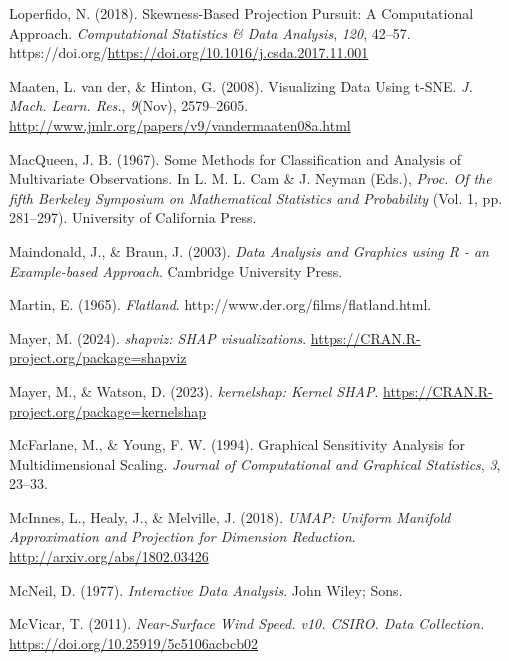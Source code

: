 \documentclass[
  letterpaper,
]{krantz}
\newlength{\cslhangindent}
\newenvironment{CSLReferences}[2] %
 {\begin{list}{}{%
  \setlength{\itemindent}{0pt}
  \setlength{\leftmargin}{0pt}
  \setlength{\parsep}{0pt}
  \ifodd #1
   \setlength{\leftmargin}{\cslhangindent}
   \setlength{\itemindent}{-1\cslhangindent}
  \fi
  \setlength{\itemsep}{#2\baselineskip}}}
 {\end{list}}
\begin{document}
\begin{CSLReferences}{1}{0}
Loperfido, N. (2018). Skewness-{B}ased {P}rojection {P}ursuit: A
{C}omputational {A}pproach. \emph{Computational Statistics \& Data
Analysis}, \emph{120}, 42--57.
https://doi.org/\url{https://doi.org/10.1016/j.csda.2017.11.001}

Maaten, L. van der, \& Hinton, G. (2008). Visualizing {D}ata {U}sing
{t-SNE}. \emph{J. Mach. Learn. Res.}, \emph{9}(Nov), 2579--2605.
\url{http://www.jmlr.org/papers/v9/vandermaaten08a.html}

MacQueen, J. B. (1967). Some {M}ethods for {C}lassification and
{A}nalysis of {M}ultivariate {O}bservations. In L. M. L. Cam \& J.
Neyman (Eds.), \emph{Proc. Of the fifth {B}erkeley {S}ymposium on
{M}athematical {S}tatistics and {P}robability} (Vol. 1, pp. 281--297).
University of California Press.

Maindonald, J., \& Braun, J. (2003). \emph{Data {A}nalysis and
{G}raphics using {R} - an {E}xample-based {A}pproach}. Cambridge
University Press.

Martin, E. (1965). \emph{Flatland}.
http://www.der.org/films/flatland.html.

Mayer, M. (2024). \emph{{shapviz}: {SHAP} visualizations}.
\url{https://CRAN.R-project.org/package=shapviz}

Mayer, M., \& Watson, D. (2023). \emph{{kernelshap}: {K}ernel {SHAP}}.
\url{https://CRAN.R-project.org/package=kernelshap}

McFarlane, M., \& Young, F. W. (1994). Graphical {S}ensitivity
{A}nalysis for {M}ultidimensional {S}caling. \emph{Journal of
Computational and Graphical Statistics}, \emph{3}, 23--33.

McInnes, L., Healy, J., \& Melville, J. (2018). \emph{{UMAP}: {U}niform
{M}anifold {A}pproximation and {P}rojection for {D}imension
{R}eduction}. \url{http://arxiv.org/abs/1802.03426}

McNeil, D. (1977). \emph{Interactive {D}ata {A}nalysis}. John Wiley;
Sons.

McVicar, T. (2011). \emph{Near-{S}urface {W}ind {S}peed. v10. CSIRO.
{D}ata {C}ollection.} \url{https://doi.org/10.25919/5c5106acbcb02}


\end{CSLReferences}
\end{document}
